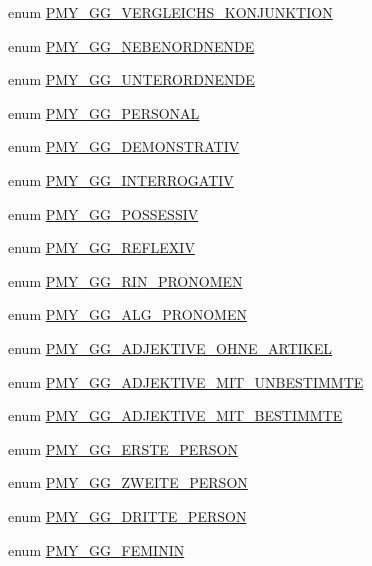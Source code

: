 \begin{DoxyCompactItemize}
\item 
enum \hyperlink{gramtab__consts_8php_a7588fc3aa67aea11e205609fd8d165d0}{PMY\_\-GG\_\-VERGLEICHS\_\-KONJUNKTION} 
\item 
enum \hyperlink{gramtab__consts_8php_a8c89c3e976215ed4268d354ef1db11dd}{PMY\_\-GG\_\-NEBENORDNENDE} 
\item 
enum \hyperlink{gramtab__consts_8php_ad72f9a7a6bac100ccead8cad06c549d6}{PMY\_\-GG\_\-UNTERORDNENDE} 
\item 
enum \hyperlink{gramtab__consts_8php_ac2adec6a38d512a7eefcc81f06dcd6f2}{PMY\_\-GG\_\-PERSONAL} 
\item 
enum \hyperlink{gramtab__consts_8php_a85997a84e4d3a6d428b26a24f5ad3c37}{PMY\_\-GG\_\-DEMONSTRATIV} 
\item 
enum \hyperlink{gramtab__consts_8php_a109c4e41085e5d7c62888d8dd0750eff}{PMY\_\-GG\_\-INTERROGATIV} 
\item 
enum \hyperlink{gramtab__consts_8php_a4e284651cf23cc09c87f56502f948b33}{PMY\_\-GG\_\-POSSESSIV} 
\item 
enum \hyperlink{gramtab__consts_8php_a42dc493396ae06417236d1839bd9fb40}{PMY\_\-GG\_\-REFLEXIV} 
\item 
enum \hyperlink{gramtab__consts_8php_a8d8db0480e570966accfa705917d50e9}{PMY\_\-GG\_\-RIN\_\-PRONOMEN} 
\item 
enum \hyperlink{gramtab__consts_8php_a49d30c2be2cf97314febac8d7d455fbd}{PMY\_\-GG\_\-ALG\_\-PRONOMEN} 
\item 
enum \hyperlink{gramtab__consts_8php_a4e33cee18dc7aa1e5d6a70f648e51261}{PMY\_\-GG\_\-ADJEKTIVE\_\-OHNE\_\-ARTIKEL} 
\item 
enum \hyperlink{gramtab__consts_8php_a93ac14b6274d29d4b3b563b73b08d29e}{PMY\_\-GG\_\-ADJEKTIVE\_\-MIT\_\-UNBESTIMMTE} 
\item 
enum \hyperlink{gramtab__consts_8php_a3d2fc6296a8a17a8545579d53ce29574}{PMY\_\-GG\_\-ADJEKTIVE\_\-MIT\_\-BESTIMMTE} 
\item 
enum \hyperlink{gramtab__consts_8php_a86ea22d6574e5b874638768bb3adb212}{PMY\_\-GG\_\-ERSTE\_\-PERSON} 
\item 
enum \hyperlink{gramtab__consts_8php_a846a52d7e45c38f49631cff12e9c230f}{PMY\_\-GG\_\-ZWEITE\_\-PERSON} 
\item 
enum \hyperlink{gramtab__consts_8php_a92a18d217194d8b3dbabba8eff9e8849}{PMY\_\-GG\_\-DRITTE\_\-PERSON} 
\item 
enum \hyperlink{gramtab__consts_8php_aa87ba344337d5356ee9c7643f106ee14}{PMY\_\-GG\_\-FEMININ} 
\item 

\end{DoxyCompactItemize}
